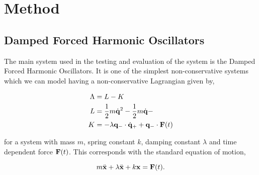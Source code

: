 \section{Method}
%

\subsection{Damped Forced Harmonic Oscillators}
\label{sec:eg-sys}

The main system used in the testing and evaluation of the system is the Damped Forced Harmonic Oscillators. It is one of the simplest non-conservative systems which we can model having a non-conservative Lagrangian given by\cite{galleyPrincipleStationaryNonconservative2014},


\begin{equation}
\label{eq:dho-sys-embedding}
\begin{aligned}
  \Lambda &= L - K \\
  L &= \frac12 m\dot{\vb{q}}^2 - \frac12 m\dot{\vb{q}} -  \\
  K &= - \lambda\vb{q}_- \cdot \dot {\vb{q}}_+ + \vb{q}_- \cdot \vb{F}(t)
\end{aligned}
\end{equation}

for a system with mass $m$, spring constant $k$, damping constant $\lambda$ and time dependent force $\vb{F}(t)$. This corresponds with the standard equation of motion,

\begin{equation}
  m \ddot{\vb x} + \lambda \ddot{\vb x} + k \vb x = \vb F(t).
\end{equation}

